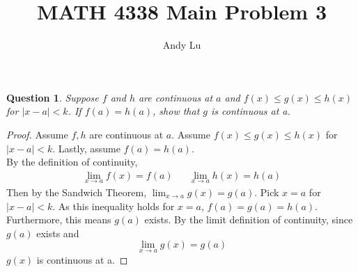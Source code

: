 \documentclass{article}
\title{MATH 4338 Main Problem 3}
\date{}
\author{Andy Lu}
\newtheorem{theorem}{Question}
\begin{document}
  \maketitle
  \begin{theorem}
    Suppose $f$ and $h$ are continuous at $a$ and $f(x) \leq g(x) \leq h(x)$ for
    $|x-a|<k$. If $f(a) = h(a)$, show that $g$ is continuous at a.
  \end{theorem}
  
  \begin{proof}
    Assume $f, h$ are continuous at $a$. Assume $f(x) \leq g(x) \leq h(x)$ for 
    $|x-a| < k$. Lastly, assume $f(a) = h(a)$. \\
    
    By the definition of continuity,
    \begin{align*}
      & & \lim_{x \rightarrow a} f(x) = f(a) & 
      & \lim_{x \rightarrow a} h(x) = h(a) & &
    \end{align*}
    Then by the Sandwich Theorem, $\lim_{x \rightarrow a} g(x) = g(a)$.
    Pick $x = a$ for $|x-a| < k$. As this inequality holds for $x=a$,
    $f(a) = g(a) = h(a)$. Furthermore, this means $g(a)$ exists. By the limit 
    definition of continuity, since $g(a)$ exists and 
    $$\lim_{x \rightarrow a} g(x) = g(a)$$ $g(x)$ is continuous at a.
  \end{proof}
\end{document}
